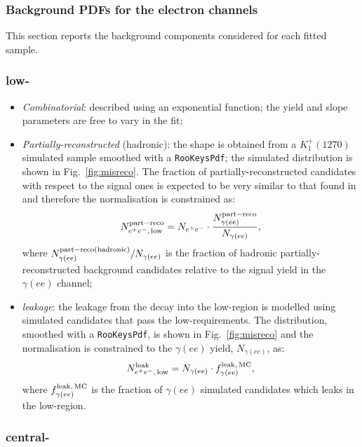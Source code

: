 \subsubsection{Background PDFs for the electron channels}
\label{sec:RKst_misreco_fit}

This section reports the background components considered for each fitted sample.

\subsubsection*{\BdToKstee low-\qsq}

\begin{itemize}

\item \textit{Combinatorial}: described using an exponential function; the yield and slope parameters are free to vary in the fit;

\item \textit{Partially-reconstructed} (hadronic): the shape is obtained from a $K_1^+(1270)$ simulated sample smoothed with
a \verb!RooKeysPdf!; the simulated distribution is shown in Fig.~\ref{fig:misreco}. The fraction of partially-reconstructed 
candidates with respect to the signal ones is expected to be very similar to that
found in \mbox{\BdToKstGee} and therefore the normalisation is constrained as:
%
$$N_{e^+ e^-, \, {\rm low}}^{\rm part-reco} = N_{e^+ e^-} \cdot \frac{N_{\gamma(ee)}^{\rm part-reco}}{N_{\gamma(ee)}},$$
%
where $N_{\gamma(ee)}^{\rm part-reco (hadronic)}/N_{\gamma(ee)}$ is the fraction of hadronic partially-reconstructed background candidates relative to the signal yield in the $\gamma(ee)$ channel;

\item \textit{\BdToKstG leakage}: the leakage from the \BdToKstGee decay into the low-\qsq region is modelled using simulated candidates that pass the low-\qsq requirements. The distribution, smoothed with a \verb!RooKeysPdf!, is shown in Fig.~\ref{fig:misreco} and the normalisation is constrained to the $\gamma(ee)$ yield, $N_{\gamma(ee)}$, as:
%
$$N_{e^+ e^-, \, {\rm low}}^{\rm leak} = N_{\gamma(ee)} \cdot f_{\gamma(ee)}^{\rm leak, \,MC},$$
%
where $f_{\gamma(ee)}^{\rm leak, \,MC}$ is the fraction of $\gamma(ee)$ simulated candidates which leaks in the low-\qsq region.

\end{itemize}


\subsubsection*{\BdToKstee central-\qsq}

